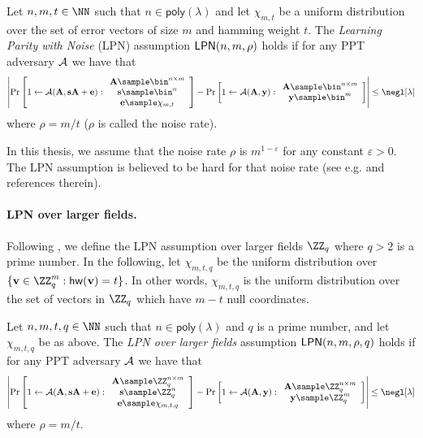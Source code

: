 \begin{definition}
Let $n,m,t\in\NN$ such that $n\in \mathsf{poly}(\lambda)$ and let $\chi_{m,t}$ be a uniform distribution over the set of error vectors of size $m$ and hamming weight $t$. The \emph{Learning Parity with Noise} (LPN) assumption $\mathsf{LPN}(n,m,\rho)$ holds if for any PPT adversary $\mathcal{A}$ we have that $$\left|\Pr\left[1\leftarrow \Ac(\An,\sn\An+\en):\begin{array}{c}
     \An\sample \bin^{n\times m} \\
     \sn\sample \bin^n\\
     \en\sample \chi_{m,t}
\end{array}\right]-\Pr\left[1\leftarrow \Ac(\An,\yn):\begin{array}{c}
     \An\sample \bin^{n\times m} \\
     \yn\sample \bin^m\\
\end{array}\right]\right|\leq \negl[\lambda]$$ where $\rho=m/t$ ($\rho$ is called the noise rate).
\end{definition}

In this thesis, we assume that the noise rate $\rho$ is $m^{1-\varepsilon}$ for any constant $\varepsilon>0$. The LPN assumption is believed to be hard for that noise rate (see e.g. \cite{CCS:BCGIKRS19} and references therein).


\paragraph{LPN over larger fields.} Following \cite{CCS:BCGIKRS19,STOC:JaiLinSah21}, we define the LPN assumption over larger fields $\ZZ_q$ where $q>2$ is a prime number. In the following, let $\chi_{m,t,q}$ be the uniform distribution over $\{\vn\in\ZZ_q^m: \mathsf{hw}(\vn)=t\}$. In other words, $\chi_{m,t,q}$ is the uniform distribution over the set of vectors in $\ZZ_q$ which have $m-t$ null coordinates.

\begin{definition}
Let $n,m,t,q\in\NN$ such that $n\in \mathsf{poly}(\lambda)$ and $q$ is a prime number, and let $\chi_{m,t,q}$ be as above. The \emph{LPN over larger fields}   assumption $\mathsf{LPN}(n,m,\rho,q)$ holds if for any PPT adversary $\mathcal{A}$ we have that $$\left|\Pr\left[1\leftarrow \Ac(\An,\sn\An+\en):\begin{array}{c}
     \An\sample \ZZ_q^{n\times m} \\
     \sn\sample \ZZ_q^n\\
     \en\sample \chi_{m,t,q}
\end{array}\right]-\Pr\left[1\leftarrow \Ac(\An,\yn):\begin{array}{c}
     \An\sample \ZZ_q^{n\times m} \\
     \yn\sample \ZZ_q^m\\
\end{array}\right]\right|\leq \negl[\lambda]$$ where $\rho=m/t$.
\end{definition}






